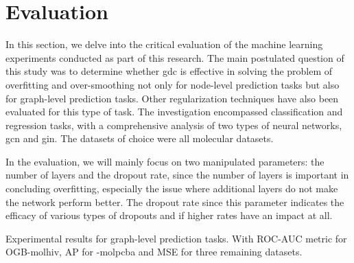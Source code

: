 %
\chapter{Evaluation}
\label{sec:eval}

In this section, we delve into the critical evaluation of the machine learning experiments conducted as part of this research.
The main postulated question of this study was to determine whether \ac{gdc} is effective in solving the problem of overfitting and over-smoothing not only for node-level prediction tasks but also for graph-level prediction tasks. Other regularization techniques have also been evaluated for this type of task.
The investigation encompassed classification and regression tasks, with a comprehensive analysis of two types of neural networks, \ac{gcn} and \ac{gin}.
The datasets of choice were all molecular datasets.

In the evaluation, we will mainly focus on two manipulated parameters: the number of layers and the dropout rate, since the number of layers is important in concluding overfitting, especially the issue where additional layers do not make the network perform better. The dropout rate since this parameter indicates the efficacy of various types of dropouts and if higher rates have an impact at all.





\begin{table*}[t]
    \caption{
        Experimental results for graph-level prediction tasks. With ROC-AUC metric for OGB-molhiv, AP for -molpcba and MSE for three remaining datasets.
    }\label{tbl:eval:results}
    \centering
    {\small%
        }
\end{table*}

